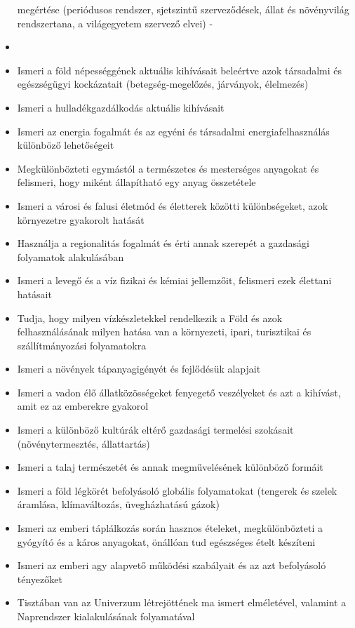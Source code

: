 \begin{itemize}
  megértése (periódusos rendszer, sjetszintű szerveződések, állat és
  növényvilág rendszertana, a világegyetem szervező elvei) -
\item
\item
  Ismeri a föld népességgének aktuális kihívásait beleértve azok
  társadalmi és egészségügyi kockázatait (betegség-megelőzés, járványok,
  élelmezés)
\item
  Ismeri a hulladékgazdálkodás aktuális kihívásait
\item
  Ismeri az energia fogalmát és az egyéni és társadalmi
  energiafelhasználás különböző lehetőségeit
\item
  Megkülönbözteti egymástól a természetes és mesterséges anyagokat és
  felismeri, hogy miként állapítható egy anyag összetétele
\item
  Ismeri a városi és falusi életmód és életterek közötti különbségeket,
  azok környezetre gyakorolt hatását
\item
  Használja a regionalitás fogalmát és érti annak szerepét a gazdasági
  folyamatok alakulásában
\item
  Ismeri a levegő és a víz fizikai és kémiai jellemzőit, felismeri ezek
  élettani hatásait
\item
  Tudja, hogy milyen vízkészletekkel rendelkezik a Föld és azok
  felhasználásának milyen hatása van a környezeti, ipari, turisztikai és
  szállítmányozási folyamatokra
\item
  Ismeri a növények tápanyagigényét és fejlődésük alapjait
\item
  Ismeri a vadon élő állatközösségeket fenyegető veszélyeket és azt a
  kihívást, amit ez az emberekre gyakorol
\item
  Ismeri a különböző kultúrák eltérő gazdasági termelési szokásait
  (növénytermesztés, állattartás)
\item
  Ismeri a talaj természetét és annak megművelésének különböző formáit
\item
  Ismeri a föld légkörét befolyásoló globális folyamatokat (tengerek és
  szelek áramlása, klímaváltozás, üvegházhatású gázok)
\item
  Ismeri az emberi táplálkozás során hasznos ételeket, megkülönbözteti a
  gyógyító és a káros anyagokat, önállóan tud egészséges ételt készíteni
\item
  Ismeri az emberi agy alapvető működési szabályait és az azt
  befolyásoló tényezőket
\item
  Tisztában van az Univerzum létrejöttének ma ismert elméletével,
  valamint a Naprendszer kialakulásának folyamatával

\end{itemize}
